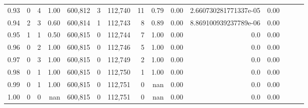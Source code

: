 \begin{tabular}{rrrrrrrrrrrrrrr}
0.93 &       0 &      4 &  1.00 &  600,812 &        3 &  112,740 &       11 &  0.79 &  0.00 &   2.660730281771337e-05 &      0.00 \\
0.94 &       2 &      3 &  0.60 &  600,814 &        1 &  112,743 &        8 &  0.89 &  0.00 &   8.869100939237789e-06 &      0.00 \\
0.95 &       1 &      1 &  0.50 &  600,815 &        0 &  112,744 &        7 &  1.00 &  0.00 &                     0.0 &      0.00 \\
0.96 &       0 &      2 &  1.00 &  600,815 &        0 &  112,746 &        5 &  1.00 &  0.00 &                     0.0 &      0.00 \\
0.97 &       0 &      3 &  1.00 &  600,815 &        0 &  112,749 &        2 &  1.00 &  0.00 &                     0.0 &      0.00 \\
0.98 &       0 &      1 &  1.00 &  600,815 &        0 &  112,750 &        1 &  1.00 &  0.00 &                     0.0 &      0.00 \\
0.99 &       0 &      1 &  1.00 &  600,815 &        0 &  112,751 &        0 &   nan &  0.00 &                     0.0 &      0.00 \\
1.00 &       0 &      0 &   nan &  600,815 &        0 &  112,751 &        0 &   nan &  0.00 &                     0.0 &      0.00 \\
\bottomrule
\end{tabular}
